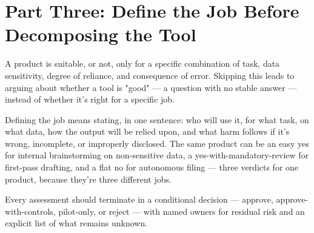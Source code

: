 \section{Part Three: Define the Job Before Decomposing the Tool}

A product is suitable, or not, only for a specific combination of task, data sensitivity, degree of reliance, and consequence of error. Skipping this leads to arguing about whether a tool is "good" --- a question with no stable answer --- instead of whether it's right for a specific job.

Defining the job means stating, in one sentence: who will use it, for what task, on what data, how the output will be relied upon, and what harm follows if it's wrong, incomplete, or improperly disclosed. The same product can be an easy yes for internal brainstorming on non-sensitive data, a yes-with-mandatory-review for first-pass drafting, and a flat no for autonomous filing --- three verdicts for one product, because they're three different jobs.

Every assessment should terminate in a conditional decision --- approve, approve-with-controls, pilot-only, or reject --- with named owners for residual risk and an explicit list of what remains unknown.
